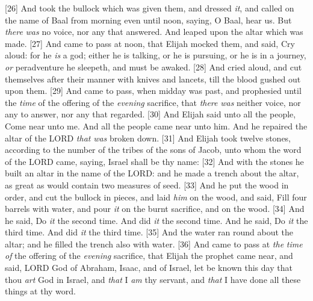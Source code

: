 [26] \textcolor[cmyk]{0.99998,1,0,0}{And   took the bullock which was given them, and   dressed \emph{it}, and called on the name of Baal from morning even until noon, saying, O Baal, hear us. But \emph{there} \emph{was} no voice, nor any that answered. And   leaped upon the altar which was made.}
[27] \textcolor[cmyk]{0.99998,1,0,0}{And  came to pass at noon, that Elijah mocked them, and said, Cry aloud: for he \emph{is} a god; either he is talking, or he is pursuing, or he is in a journey, \emph{or} peradventure he sleepeth, and must be awaked.}
[28] \textcolor[cmyk]{0.99998,1,0,0}{And   cried aloud, and cut themselves after their manner with knives and lancets, till the blood gushed out upon them.}
[29] \textcolor[cmyk]{0.99998,1,0,0}{And  came to pass, when midday was past, and   prophesied until the \emph{time} of the offering of the \emph{evening} sacrifice, that \emph{there} \emph{was} neither voice, nor any to answer, nor any that regarded.}
[30] \textcolor[cmyk]{0.99998,1,0,0}{And Elijah said unto all the people, Come near unto me. And all the people came near unto him. And he repaired the altar of the LORD \emph{that} \emph{was} broken down.}
[31] \textcolor[cmyk]{0.99998,1,0,0}{And Elijah took twelve stones, according to the number of the tribes of the sons of Jacob, unto whom the word of the LORD came, saying, Israel shall be thy name:}
[32] \textcolor[cmyk]{0.99998,1,0,0}{And with the stones he built an altar in the name of the LORD: and he made a trench about the altar, as great as would contain two measures of seed.}
[33] \textcolor[cmyk]{0.99998,1,0,0}{And he put the wood in order, and cut the bullock in pieces, and laid \emph{him} on the wood, and said, Fill four barrels with water, and pour \emph{it} on the burnt sacrifice, and on the wood.}
[34] \textcolor[cmyk]{0.99998,1,0,0}{And he said, Do \emph{it} the second time. And   did \emph{it} the second time. And he said, Do \emph{it} the third time. And   did \emph{it} the third time.}
[35] \textcolor[cmyk]{0.99998,1,0,0}{And the water ran round about the altar; and he filled the trench also with water.}
[36] \textcolor[cmyk]{0.99998,1,0,0}{And  came to pass at \emph{the} \emph{time} \emph{of} the offering of the \emph{evening} sacrifice, that Elijah the prophet came near, and said, LORD God of Abraham, Isaac, and of Israel, let  be known this day that thou \emph{art} God in Israel, and \emph{that} I \emph{am} thy servant, and \emph{that} I have done all these things at thy word.}
